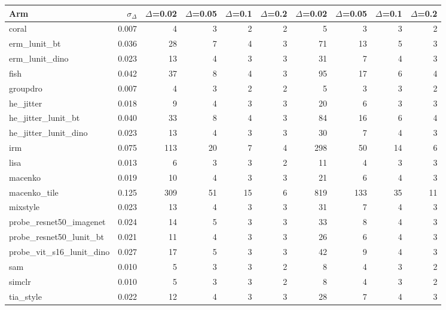 \begin{tabular}{lrrrrrrrrr}
\toprule
Arm & $\sigma_\Delta$ & $\Delta$=0.02 & $\Delta$=0.05 & $\Delta$=0.1 & $\Delta$=0.2 & $\Delta$=0.02 & $\Delta$=0.05 & $\Delta$=0.1 & $\Delta$=0.2 \\
\midrule
coral & 0.007 & 4 & 3 & 2 & 2 & 5 & 3 & 3 & 2 \\
erm\_lunit\_bt & 0.036 & 28 & 7 & 4 & 3 & 71 & 13 & 5 & 3 \\
erm\_lunit\_dino & 0.023 & 13 & 4 & 3 & 3 & 31 & 7 & 4 & 3 \\
fish & 0.042 & 37 & 8 & 4 & 3 & 95 & 17 & 6 & 4 \\
groupdro & 0.007 & 4 & 3 & 2 & 2 & 5 & 3 & 3 & 2 \\
he\_jitter & 0.018 & 9 & 4 & 3 & 3 & 20 & 6 & 3 & 3 \\
he\_jitter\_lunit\_bt & 0.040 & 33 & 8 & 4 & 3 & 84 & 16 & 6 & 4 \\
he\_jitter\_lunit\_dino & 0.023 & 13 & 4 & 3 & 3 & 30 & 7 & 4 & 3 \\
irm & 0.075 & 113 & 20 & 7 & 4 & 298 & 50 & 14 & 6 \\
lisa & 0.013 & 6 & 3 & 3 & 2 & 11 & 4 & 3 & 3 \\
macenko & 0.019 & 10 & 4 & 3 & 3 & 21 & 6 & 4 & 3 \\
macenko\_tile & 0.125 & 309 & 51 & 15 & 6 & 819 & 133 & 35 & 11 \\
mixstyle & 0.023 & 13 & 4 & 3 & 3 & 31 & 7 & 4 & 3 \\
probe\_resnet50\_imagenet & 0.024 & 14 & 5 & 3 & 3 & 33 & 8 & 4 & 3 \\
probe\_resnet50\_lunit\_bt & 0.021 & 11 & 4 & 3 & 3 & 26 & 6 & 4 & 3 \\
probe\_vit\_s16\_lunit\_dino & 0.027 & 17 & 5 & 3 & 3 & 42 & 9 & 4 & 3 \\
sam & 0.010 & 5 & 3 & 3 & 2 & 8 & 4 & 3 & 2 \\
simclr & 0.010 & 5 & 3 & 3 & 2 & 8 & 4 & 3 & 2 \\
tia\_style & 0.022 & 12 & 4 & 3 & 3 & 28 & 7 & 4 & 3 \\
\bottomrule
\end{tabular}
